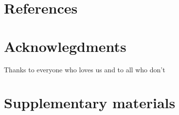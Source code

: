 \documentclass[12pt,review,authoryear]{elsarticle}
\begin{document}

\section*{References}

	 
	



\section*{Acknowlegdments}
	Thanks to everyone who loves us and to all who don't



\section*{Supplementary materials}
\end{document}
